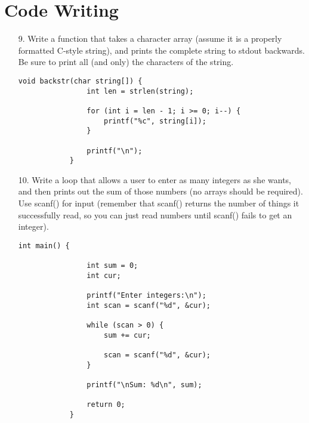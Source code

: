 \documentclass{article}
\begin{document}
\section*{Code Writing}
\begin{itemize}
	\item[9.] Write a function that takes a character array (assume it is a properly formatted C-style string), and prints the complete string to stdout backwards. Be sure to print all (and only) the characters of the string.

			\begin{lstlisting}[style=nonumbers]
			void backstr(char string[]) {
				int len = strlen(string);
				
				for (int i = len - 1; i >= 0; i--) {
					printf("%c", string[i]);
				}
				
				printf("\n");
			}
			\end{lstlisting}	

			\newpage
	\item[10.] Write a loop that allows a user to enter as many integers as she wants, and then prints out the sum of those numbers (no arrays should be required). Use scanf() for input (remember that scanf() returns the number of things it successfully read, so you can just read numbers until scanf() fails to get an integer).

		\begin{lstlisting}[style=nonumbers]
			int main() {

				int sum = 0;
				int cur;

				printf("Enter integers:\n");
				int scan = scanf("%d", &cur);

				while (scan > 0) {
					sum += cur;

					scan = scanf("%d", &cur);
				}

				printf("\nSum: %d\n", sum);

				return 0;
			}
		\end{lstlisting}

\end{itemize}
\end{document}
